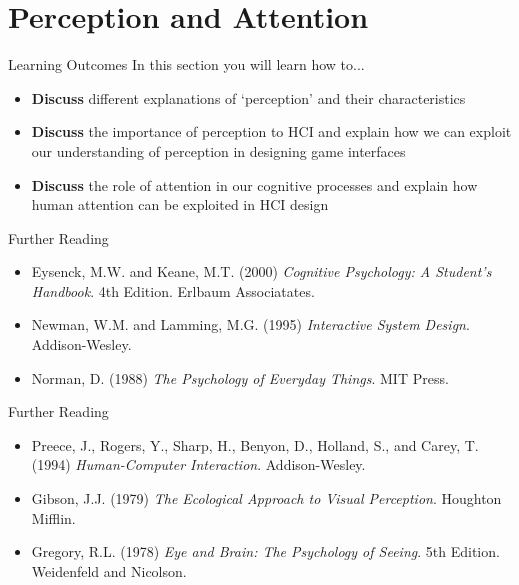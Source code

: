\part{Perception and Attention}
\frame{\partpage}

\begin{frame}{Learning Outcomes}
	In this section you will learn how to...
	
	\begin{itemize}
		\item \textbf{Discuss} different explanations of `perception' and their characteristics
		\item \textbf{Discuss} the importance of perception to HCI and explain how we can exploit
		our understanding of perception in designing game interfaces
		\item \textbf{Discuss} the role of attention in our cognitive processes and explain how human
		attention can be exploited in HCI design
	\end{itemize}
\end{frame}

\begin{frame}{Further Reading}
	\begin{itemize}
		\item Eysenck, M.W. and Keane, M.T. (2000) \textit{Cognitive Psychology: A Student's Handbook}. 4th Edition. Erlbaum Associatates.
		\item Newman, W.M. and Lamming, M.G. (1995) \textit{Interactive System Design}. Addison-Wesley.
		\item Norman, D. (1988) \textit{The Psychology of Everyday Things}. MIT Press.
	\end{itemize}
\end{frame}

\begin{frame}{Further Reading}
	\begin{itemize}
		\item Preece, J., Rogers, Y., Sharp, H., Benyon, D., Holland, S., and Carey, T. (1994) \textit{Human-Computer Interaction}. Addison-Wesley.
		\item Gibson, J.J. (1979) \textit{The Ecological Approach to Visual Perception}. Houghton Mifflin.
		\item Gregory, R.L. (1978) \textit{Eye and Brain: The Psychology of Seeing}. 5th Edition. Weidenfeld and Nicolson.
	\end{itemize}
\end{frame}

